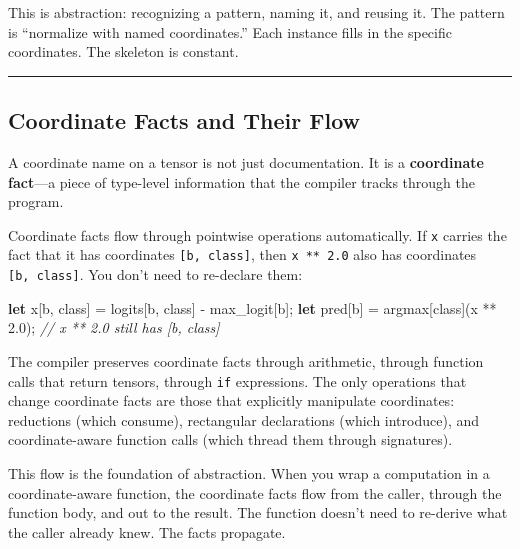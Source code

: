 \documentclass[11pt,]{article}
\newenvironment{Shaded}{}{}
\newcommand{\CommentTok}[1]{\textcolor[rgb]{0.38,0.63,0.69}{\textit{#1}}}
\newcommand{\DecValTok}[1]{\textcolor[rgb]{0.25,0.63,0.44}{#1}}
\newcommand{\KeywordTok}[1]{\textcolor[rgb]{0.00,0.44,0.13}{\textbf{#1}}}
\newcommand{\NormalTok}[1]{#1}
\newcommand{\OperatorTok}[1]{\textcolor[rgb]{0.40,0.40,0.40}{#1}}
\begin{document}
This is abstraction: recognizing a pattern, naming it, and reusing it.
The pattern is ``normalize with named coordinates.'' Each instance fills
in the specific coordinates. The skeleton is constant.

\begin{center}\rule{0.5\linewidth}{0.4pt}\end{center}

\hypertarget{coordinate-facts-and-their-flow}{%
\subsection{Coordinate Facts and Their
Flow}\label{coordinate-facts-and-their-flow}}

A coordinate name on a tensor is not just documentation. It is a
\textbf{coordinate fact}---a piece of type-level information that the
compiler tracks through the program.

Coordinate facts flow through pointwise operations automatically. If
\texttt{x} carries the fact that it has coordinates
\texttt{{[}b,\ class{]}}, then \texttt{x\ **\ 2.0} also has coordinates
\texttt{{[}b,\ class{]}}. You don't need to re-declare them:

\begin{Shaded}
\begin{Highlighting}[]
\KeywordTok{let}\NormalTok{ x}\OperatorTok{[}\NormalTok{b, class}\OperatorTok{]}\NormalTok{ = logits}\OperatorTok{[}\NormalTok{b, class}\OperatorTok{]}\NormalTok{ - max_logit}\OperatorTok{[}\NormalTok{b}\OperatorTok{]}\NormalTok{;}
\KeywordTok{let}\NormalTok{ pred}\OperatorTok{[}\NormalTok{b}\OperatorTok{]}\NormalTok{ = argmax}\OperatorTok{[}\NormalTok{class}\OperatorTok{]}\NormalTok{(x ** }\DecValTok{2.0}\NormalTok{);   }\CommentTok{// x ** 2.0 still has [b, class]}
\end{Highlighting}
\end{Shaded}

The compiler preserves coordinate facts through arithmetic, through
function calls that return tensors, through \texttt{if} expressions. The
only operations that change coordinate facts are those that explicitly
manipulate coordinates: reductions (which consume), rectangular
declarations (which introduce), and coordinate-aware function calls
(which thread them through signatures).

This flow is the foundation of abstraction. When you wrap a computation
in a coordinate-aware function, the coordinate facts flow from the
caller, through the function body, and out to the result. The function
doesn't need to re-derive what the caller already knew. The facts
propagate.
\end{document}
